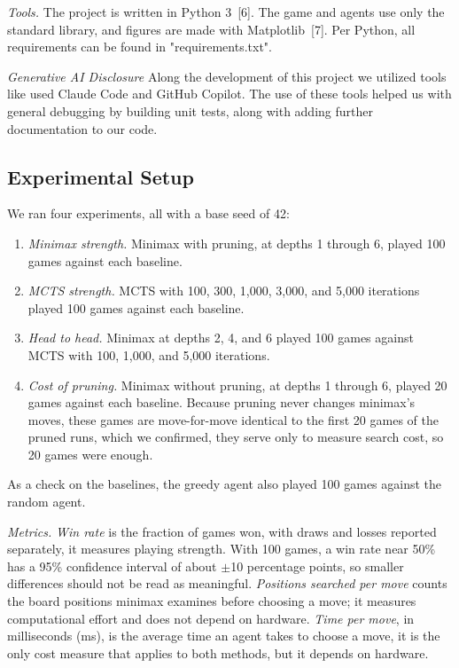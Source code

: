\documentclass[10pt,twocolumn,letterpaper]{article}
\begin{document}
\textit{Tools.} The project is written in Python 3~[6]. The game and agents use only the
standard library, and figures are made with Matplotlib~[7]. Per Python, all requirements can
be found in "requirements.txt".

\textit{Generative AI Disclosure} Along the development of this project we utilized tools
like used Claude Code and GitHub Copilot. The use of these tools helped us with general debugging
by building unit tests, along with adding further documentation to our code.

\subsection{Experimental Setup}

We ran four experiments, all with a base seed of 42:
\begin{enumerate}[leftmargin=*,nosep]
  \item \emph{Minimax strength.} Minimax with pruning, at depths 1 through 6, played 100
        games against each baseline.
  \item \emph{MCTS strength.} MCTS with 100, 300, 1,000, 3,000, and 5,000 iterations
        played 100 games against each baseline.
  \item \emph{Head to head.} Minimax at depths 2, 4, and 6 played 100 games against MCTS
        with 100, 1,000, and 5,000 iterations.
  \item \emph{Cost of pruning.} Minimax without pruning, at depths 1 through 6, played 20
        games against each baseline. Because pruning never changes minimax's moves, these
        games are move-for-move identical to the first 20 games of the pruned runs, which we
        confirmed, they serve only to measure search cost, so 20 games were enough.
\end{enumerate}
As a check on the baselines, the greedy agent also played 100 games against the random
agent.

\textit{Metrics.} \emph{Win rate} is the fraction of games won, with draws and losses
reported separately, it measures playing strength. With 100 games, a win rate near 50\% has
a 95\% confidence interval of about $\pm$10 percentage points, so smaller differences should
not be read as meaningful. \emph{Positions searched per move} counts the board positions
minimax examines before choosing a move; it measures computational effort and does not
depend on hardware. \emph{Time per move}, in milliseconds (ms), is the average time an agent
takes to choose a move, it is the only cost measure that applies to both methods, but it
depends on hardware.
\end{document}
